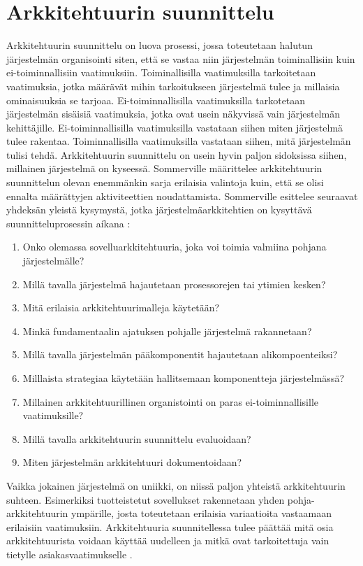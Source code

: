 \documentclass[utf8]{gradu3}
\begin{document}
\section{Arkkitehtuurin suunnittelu}

Arkkitehtuurin suunnittelu on luova prosessi, jossa toteutetaan halutun järjestelmän organisointi siten, että se vastaa niin järjestelmän toiminallisiin kuin ei-toiminnallisiin vaatimuksiin. Toiminallisilla vaatimuksilla tarkoitetaan vaatimuksia, jotka määrävät mihin tarkoitukseen järjestelmä tulee ja millaisia ominaisuuksia se tarjoaa. Ei-toiminnallisilla vaatimuksilla tarkotetaan järjestelmän sisäisiä vaatimuksia, jotka ovat usein näkyvissä vain järjestelmän kehittäjille. Ei-toiminnallisilla vaatimuksilla vastataan siihen miten järjestelmä tulee rakentaa. Toiminnallisilla vaatimuksilla vastataan siihen, mitä järjestelmän tulisi tehdä.  Arkkitehtuurin suunnittelu on usein hyvin paljon sidoksissa siihen, millainen järjestelmä on kyseessä. Sommerville määrittelee arkkitehtuurin suunnittelun olevan enemmänkin sarja erilaisia valintoja kuin, että se olisi ennalta määrättyjen aktiviteettien noudattamista. Sommerville esittelee seuraavat yhdeksän yleistä kysymystä, jotka järjestelmäarkkitehtien on kysyttävä suunnitteluprosessin aíkana \parencite[s. 151]{Sommerville}:

\begin{enumerate}  
\item Onko olemassa sovelluarkkitehtuuria, joka voi toimia valmiina pohjana järjestelmälle?
\item Millä tavalla järjestelmä hajautetaan prosessorejen tai ytimien kesken?
\item Mitä erilaisia arkkitehtuurimalleja käytetään?
\item Minkä fundamentaalin ajatuksen pohjalle järjestelmä rakannetaan?
\item Millä tavalla järjestelmän pääkomponentit hajautetaan alikompoenteiksi?
\item Milllaista strategiaa käytetään hallitsemaan komponentteja järjestelmässä?
\item Millainen arkkitehtuurillinen organistointi on paras ei-toiminnallisille vaatimuksille?
\item Millä tavalla arkkitehtuurin suunnittelu evaluoidaan?
\item Miten järjestelmän arkkitehtuuri dokumentoidaan?
\end{enumerate}

Vaikka jokainen järjestelmä on uniikki, on niissä paljon yhteistä arkkitehtuurin suhteen. Esimerkiksi tuotteistetut sovellukset rakennetaan yhden pohja-arkkitehtuurin ympärille, josta toteutetaan erilaisia variaatioita vastaamaan erilaisiin vaatimuksiin. Arkkitehtuuria suunnitellessa tulee päättää mitä osia arkkitehtuurista voidaan käyttää uudelleen ja mitkä ovat tarkoitettuja vain tietylle asiakasvaatimukselle \parencite[s. 151]{Sommerville}.
\end{document}
